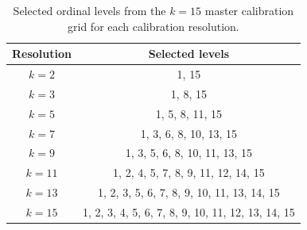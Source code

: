 
\begin{table}[t]
\centering
\caption{Selected ordinal levels from the $k=15$ master calibration grid for each calibration resolution.}
\label{tab:k_level_selection}
\begin{tabular}{cc}
\toprule
Resolution & Selected levels \\
\midrule
$k=2$ & 1, 15 \\
$k=3$ & 1, 8, 15 \\
$k=5$ & 1, 5, 8, 11, 15 \\
$k=7$ & 1, 3, 6, 8, 10, 13, 15 \\
$k=9$ & 1, 3, 5, 6, 8, 10, 11, 13, 15 \\
$k=11$ & 1, 2, 4, 5, 7, 8, 9, 11, 12, 14, 15 \\
$k=13$ & 1, 2, 3, 5, 6, 7, 8, 9, 10, 11, 13, 14, 15 \\
$k=15$ & 1, 2, 3, 4, 5, 6, 7, 8, 9, 10, 11, 12, 13, 14, 15 \\

\bottomrule
\end{tabular}
\end{table}
